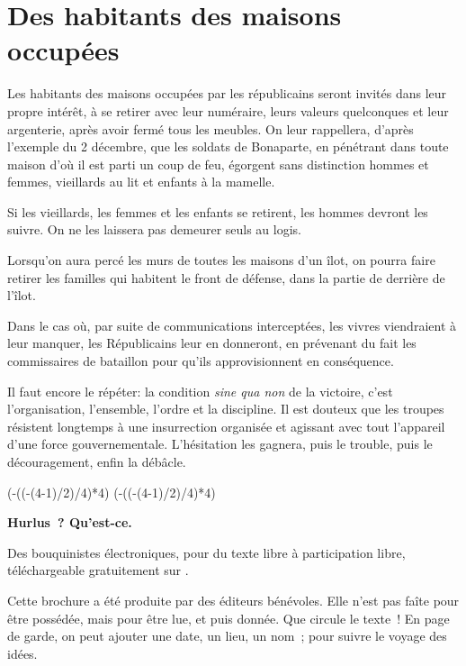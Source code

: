 \documentclass[french,twoside]{book} %
\def\truncdiv#1#2{((#1-(#2-1)/2)/#2)}
\def\moduloop#1#2{(#1-\truncdiv{#1}{#2}*#2)}
\def\modulo#1#2{\number\numexpr\moduloop{#1}{#2}\relax}
\begin{document}
\section[{Des habitants des maisons occupées}]{Des habitants des maisons occupées}\renewcommand{\leftmark}{Des habitants des maisons occupées}

\noindent Les habitants des maisons occupées par les républicains seront invités dans leur propre intérêt, à se retirer avec leur numéraire, leurs valeurs quelconques et leur argenterie, après avoir fermé tous les meubles. On leur rappellera, d’après l’exemple du 2 décembre, que les soldats de Bonaparte, en pénétrant dans toute maison d’où il est parti un coup de feu, égorgent sans distinction hommes et femmes, vieillards au lit et enfants à la mamelle.\par
Si les vieillards, les femmes et les enfants se retirent, les hommes devront les suivre. On ne les laissera pas demeurer seuls au logis.\par
Lorsqu’on aura percé les murs de toutes les maisons d’un îlot, on pourra faire retirer les familles qui habitent le front de défense, dans la partie de derrière de l’îlot.\par
Dans le cas où, par suite de communications interceptées, les vivres viendraient à leur manquer, les Républicains leur en donneront, en prévenant du fait les commissaires de bataillon pour qu’ils approvisionnent en conséquence.\par
Il faut encore le répéter: la condition \emph{sine qua non} de la victoire, c’est l’organisation, l’ensemble, l’ordre et la discipline. Il est douteux que les troupes résistent longtemps à une insurrection organisée et agissant avec tout l’appareil d’une force gouvernementale. L'hésitation les gagnera, puis le trouble, puis le découragement, enfin la débâcle.
 


\ifbooklet
  \pagestyle{empty}
  \clearpage
  \ifnum\modulo{\value{page}}{4}=0 \hbox{}\newpage\hbox{}\newpage\fi
  \ifnum\modulo{\value{page}}{4}=1 \hbox{}\newpage\hbox{}\newpage\fi


  \hbox{}\newpage
  \ifodd\value{page}\hbox{}\newpage\fi
  {\centering\color{rubric}\bfseries\noindent\large
    Hurlus ? Qu’est-ce.\par
    \bigskip
  }
  \noindent Des bouquinistes électroniques, pour du texte libre à participation libre,
  téléchargeable gratuitement sur \href{https://hurlus.fr}{}.\par
  \bigskip
  \noindent Cette brochure a été produite par des éditeurs bénévoles.
  Elle n’est pas faîte pour être possédée, mais pour être lue, et puis donnée.
  Que circule le texte !
  En page de garde, on peut ajouter une date, un lieu, un nom ; pour suivre le voyage des idées.
  \par
\end{document}
